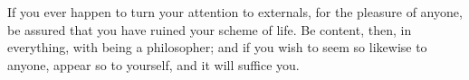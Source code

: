 If you  ever happen to  turn your attention to  externals, for the  pleasure of
anyone, be assured that you have ruined  your scheme of life. Be content, then,
in everything, with being a philosopher; and if you wish to seem so likewise to
anyone, appear so to yourself, and it will suffice you.
